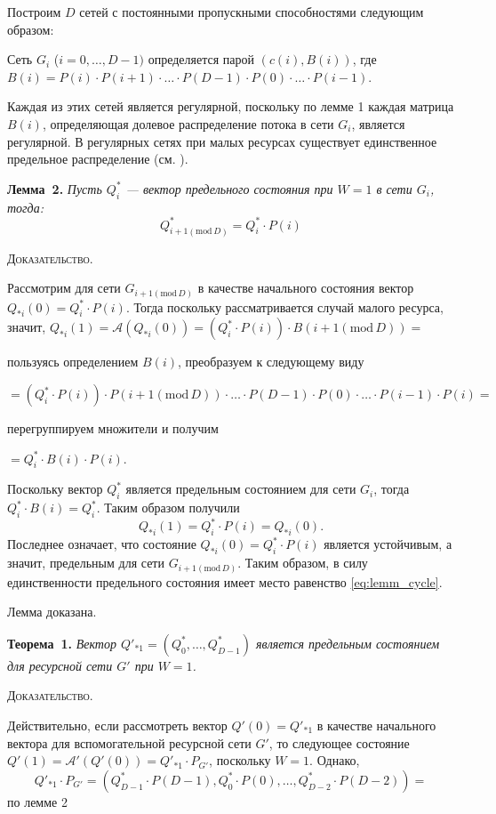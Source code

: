 \documentclass[a4paper,12pt]{article}
\begin{document}
	Построим $D$ сетей с постоянными пропускными способностями следующим образом:
    
    Сеть $G_i$ ($i = 0,\dots, D-1)$ определяется парой $(c(i),B(i))$, где $B(i) = P(i)\cdot P(i+1)\cdot \ldots \cdot P(D-1) \cdot P(0) \cdot \ldots \cdot P(i-1)$.
    
    Каждая из этих сетей является регулярной, поскольку по лемме 1 каждая матрица $B(i)$, определяющая долевое распределение потока в сети $G_i$, является регулярной. В регулярных сетях при малых ресурсах существует единственное предельное распределение (см. \cite{SvSkor:Zhil1}).

{\bf Лемма~2. }{\it
    	Пусть $Q^*_i$ --- вектор предельного состояния при $W=1$ в сети $G_i$, тогда: 
    	\begin{equation}
    	  \label{eq:lemm_cycle}
    		Q^*_{i+1 (\mathrm{mod}\, D)} = Q^*_i \cdot P(i)
    	\end{equation}    	
}

\textsc{Доказательство. }
	
	Рассмотрим для сети $G_{i+1(\mathrm{mod}\, D)}$ в качестве начального состояния вектор $Q_{*i}(0)=Q^*_i\cdot P(i)$.  Тогда поскольку рассматривается случай малого ресурса, значит, $Q_{*i}(1)=\mathcal{A}\left(Q_{*i}(0)\right)=(Q^*_i\cdot P(i))\cdot B(i+1(\mathrm{mod}\, D))=$

пользуясь определением	$B(i)$, преобразуем к следующему виду

\noindent	$=(Q^*_i\cdot P(i))\cdot P(i+1(\mathrm{mod}\, D))\cdot \ldots \cdot P(D-1) \cdot P(0) \cdot \ldots \cdot P(i-1)\cdot P(i)=$

перегруппируем множители и получим

$=Q^*_i\cdot B(i)\cdot P(i)$.

Поскольку вектор $Q^*_i$ является предельным состоянием для сети $G_i$, тогда $Q^*_i\cdot B(i)=Q^*_i$. Таким образом получили
$$Q_{*i}(1)=Q^*_i\cdot P(i)=Q_{*i}(0).$$
Последнее означает, что состояние $Q_{*i}(0)=Q^*_i\cdot P(i)$ является устойчивым, а значит, предельным для сети $G_{i+1(\mathrm{mod}\, D)}$. Таким образом, в силу единственности предельного состояния имеет место равенство \eqref{eq:lemm_cycle}.
	
	Лемма доказана.


{\bf Теорема~1. }{\it 
  Вектор $Q'_{*1}=\left(Q^*_0,\dots,Q^*_{D-1}\right)$ является предельным состоянием для ресурсной сети $G'$ при $W=1$.
}

\textsc{Доказательство. }

Действительно, если рассмотреть вектор $Q'(0)=Q'_{*1}$ в качестве начального вектора для вспомогательной ресурсной сети $G'$, то следующее состояние $Q'(1)=\mathcal{A'}(Q'(0))=Q'_{*1}\cdot P_{G'}$, поскольку $W=1$. Однако, $$Q'_{*1}\cdot P_{G'}=\left(Q^*_{D-1}\cdot P(D-1),Q^*_{0}\cdot P(0),\dots,Q^*_{D-2}\cdot P(D-2)\right)=$$
по лемме 2 
\end{document}
